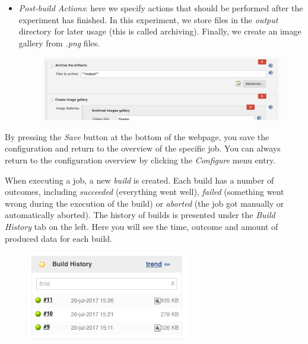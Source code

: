 \documentclass{article}
\begin{document}
\begin{itemize}
\begin{figure}[h!]
	\end{figure}
	\item \emph{Post-build Actions}: here we specify actions that should be performed after the experiment has finished. In this experiment, we store files in the \emph{output} directory for later usage (this is called archiving). Finally, we create an image gallery from \emph{.png} files.
	\begin{figure}[h!]
		\includegraphics[width=\columnwidth]{jenkins_post_build.png}
	\end{figure}
\end{itemize}

By pressing the \emph{Save} button at the bottom of the webpage, you save the configuration and return to the overview of the specific job.
You can always return to the configuration overview by clicking the \emph{Configure} menu entry.

When executing a job, a new \emph{build} is created.
Each build has a number of outcomes, including \emph{succeeded} (everything went well), \emph{failed} (something went wrong during the execution of the build) or \emph{aborted} (the job got manually or automatically aborted).
The history of builds is presented under the \emph{Build History} tab on the left.
Here you will see the time, outcome and amount of produced data for each build.

\begin{figure}[h!]
	\centering
	\includegraphics[width=7cm]{jenkins_build_history.png}
\end{figure}
\end{document}
